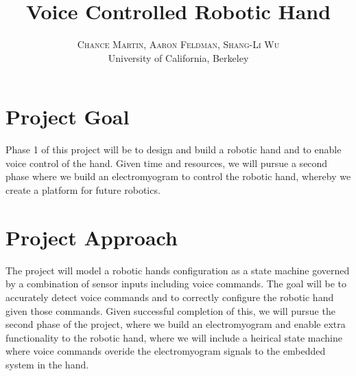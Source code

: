 \documentclass[twoside]{article}
\title{\vspace{-15mm}\fontsize{24pt}{10pt}\selectfont\textbf{Voice Controlled Robotic Hand}} %
\author{
\large
\textsc{Chance Martin, Aaron Feldman, Shang-Li Wu}\\[2mm] %
\normalsize University of California, Berkeley \\ %
\vspace{-5mm}
}
\date{}
\begin{document}
\maketitle %

\thispagestyle{fancy} %


%


\section{Project Goal}
Phase 1 of this project will be to design and build a robotic hand and to enable voice control of the hand. Given time and resources, we will pursue a second phase where we build an electromyogram to control the robotic hand, whereby we create a platform for future robotics. 



\section{Project Approach}
The project will model a robotic hands configuration as a state machine governed by a combination of sensor inputs including voice commands. The goal will be to accurately detect voice commands and to correctly configure the robotic hand given those commands. Given successful completion of this, we will pursue the second phase of the project, where we build an electromyogram and enable extra functionality to the robotic hand, where we will include a heirical state machine where voice commands overide the  electromyogram signals to the embedded system in the hand.

\end{document}
